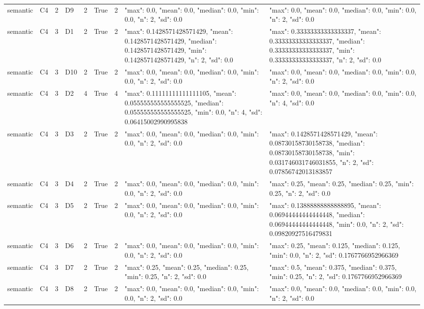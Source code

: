 \begin{tabular}{lllllllll}
semantic & C4 & 2 & D9 & 2 & True & 2 & {"max": 0.0, "mean": 0.0, "median": 0.0, "min": 0.0, "n": 2, "sd": 0.0} & {"max": 0.0, "mean": 0.0, "median": 0.0, "min": 0.0, "n": 2, "sd": 0.0} \\
semantic & C4 & 3 & D1 & 2 & True & 2 & {"max": 0.1428571428571429, "mean": 0.1428571428571429, "median": 0.1428571428571429, "min": 0.1428571428571429, "n": 2, "sd": 0.0} & {"max": 0.33333333333333337, "mean": 0.33333333333333337, "median": 0.33333333333333337, "min": 0.33333333333333337, "n": 2, "sd": 0.0} \\
semantic & C4 & 3 & D10 & 2 & True & 2 & {"max": 0.0, "mean": 0.0, "median": 0.0, "min": 0.0, "n": 2, "sd": 0.0} & {"max": 0.0, "mean": 0.0, "median": 0.0, "min": 0.0, "n": 2, "sd": 0.0} \\
semantic & C4 & 3 & D2 & 4 & True & 4 & {"max": 0.11111111111111105, "mean": 0.055555555555555525, "median": 0.055555555555555525, "min": 0.0, "n": 4, "sd": 0.06415002990995838} & {"max": 0.0, "mean": 0.0, "median": 0.0, "min": 0.0, "n": 4, "sd": 0.0} \\
semantic & C4 & 3 & D3 & 2 & True & 2 & {"max": 0.0, "mean": 0.0, "median": 0.0, "min": 0.0, "n": 2, "sd": 0.0} & {"max": 0.1428571428571429, "mean": 0.08730158730158738, "median": 0.08730158730158738, "min": 0.031746031746031855, "n": 2, "sd": 0.07856742013183857} \\
semantic & C4 & 3 & D4 & 2 & True & 2 & {"max": 0.0, "mean": 0.0, "median": 0.0, "min": 0.0, "n": 2, "sd": 0.0} & {"max": 0.25, "mean": 0.25, "median": 0.25, "min": 0.25, "n": 2, "sd": 0.0} \\
semantic & C4 & 3 & D5 & 2 & True & 2 & {"max": 0.0, "mean": 0.0, "median": 0.0, "min": 0.0, "n": 2, "sd": 0.0} & {"max": 0.13888888888888895, "mean": 0.06944444444444448, "median": 0.06944444444444448, "min": 0.0, "n": 2, "sd": 0.09820927516479831} \\
semantic & C4 & 3 & D6 & 2 & True & 2 & {"max": 0.0, "mean": 0.0, "median": 0.0, "min": 0.0, "n": 2, "sd": 0.0} & {"max": 0.25, "mean": 0.125, "median": 0.125, "min": 0.0, "n": 2, "sd": 0.1767766952966369} \\
semantic & C4 & 3 & D7 & 2 & True & 2 & {"max": 0.25, "mean": 0.25, "median": 0.25, "min": 0.25, "n": 2, "sd": 0.0} & {"max": 0.5, "mean": 0.375, "median": 0.375, "min": 0.25, "n": 2, "sd": 0.1767766952966369} \\
semantic & C4 & 3 & D8 & 2 & True & 2 & {"max": 0.0, "mean": 0.0, "median": 0.0, "min": 0.0, "n": 2, "sd": 0.0} & {"max": 0.0, "mean": 0.0, "median": 0.0, "min": 0.0, "n": 2, "sd": 0.0} \\

\end{tabular}

